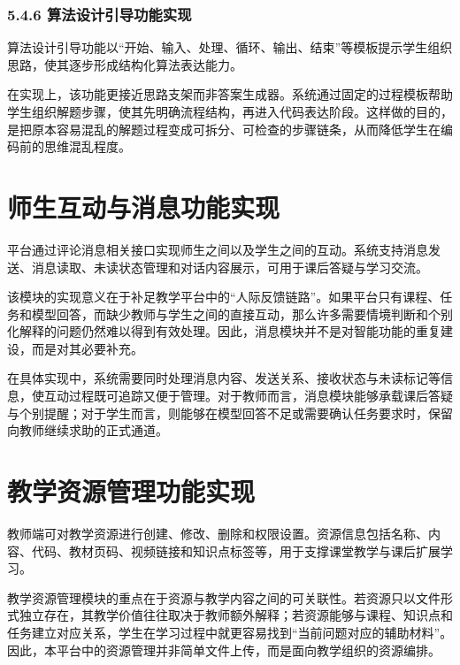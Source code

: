 \subsubsection{5.4.6 算法设计引导功能实现}\label{ux7b97ux6cd5ux8bbeux8ba1ux5f15ux5bfcux529fux80fdux5b9eux73b0}

算法设计引导功能以``开始、输入、处理、循环、输出、结束''等模板提示学生组织思路，使其逐步形成结构化算法表达能力。

在实现上，该功能更接近思路支架而非答案生成器。系统通过固定的过程模板帮助学生组织解题步骤，使其先明确流程结构，再进入代码表达阶段。这样做的目的，是把原本容易混乱的解题过程变成可拆分、可检查的步骤链条，从而降低学生在编码前的思维混乱程度。

\section{师生互动与消息功能实现}\label{ux5e08ux751fux4e92ux52a8ux4e0eux6d88ux606fux529fux80fdux5b9eux73b0}

平台通过评论消息相关接口实现师生之间以及学生之间的互动。系统支持消息发送、消息读取、未读状态管理和对话内容展示，可用于课后答疑与学习交流。

该模块的实现意义在于补足教学平台中的``人际反馈链路''。如果平台只有课程、任务和模型回答，而缺少教师与学生之间的直接互动，那么许多需要情境判断和个别化解释的问题仍然难以得到有效处理。因此，消息模块并不是对智能功能的重复建设，而是对其必要补充。

在具体实现中，系统需要同时处理消息内容、发送关系、接收状态与未读标记等信息，使互动过程既可追踪又便于管理。对于教师而言，消息模块能够承载课后答疑与个别提醒；对于学生而言，则能够在模型回答不足或需要确认任务要求时，保留向教师继续求助的正式通道。

\section{教学资源管理功能实现}\label{ux6559ux5b66ux8d44ux6e90ux7ba1ux7406ux529fux80fdux5b9eux73b0}

教师端可对教学资源进行创建、修改、删除和权限设置。资源信息包括名称、内容、代码、教材页码、视频链接和知识点标签等，用于支撑课堂教学与课后扩展学习。

教学资源管理模块的重点在于资源与教学内容之间的可关联性。若资源只以文件形式独立存在，其教学价值往往取决于教师额外解释；若资源能够与课程、知识点和任务建立对应关系，学生在学习过程中就更容易找到``当前问题对应的辅助材料''。因此，本平台中的资源管理并非简单文件上传，而是面向教学组织的资源编排。

